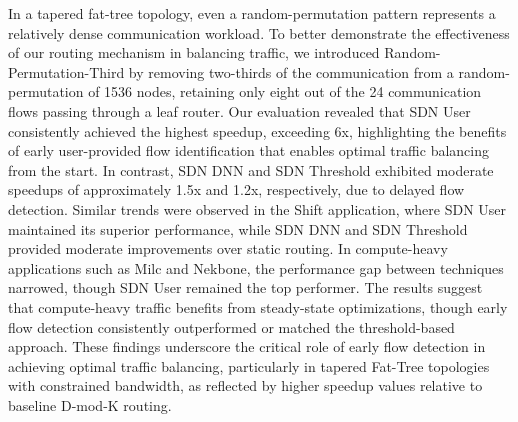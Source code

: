In a tapered fat-tree topology, even a random-permutation pattern represents a relatively dense communication workload. To better demonstrate the effectiveness of our routing mechanism in balancing traffic, we introduced Random-Permutation-Third by removing two-thirds of the communication from a random-permutation of 1536 nodes, retaining only eight out of the 24 communication flows passing through a leaf router. Our evaluation revealed that SDN User consistently achieved the highest speedup, exceeding 6x, highlighting the benefits of early user-provided flow identification that enables optimal traffic balancing from the start. In contrast, SDN DNN and SDN Threshold exhibited moderate speedups of approximately 1.5x and 1.2x, respectively, due to delayed flow detection. Similar trends were observed in the Shift application, where SDN User maintained its superior performance, while SDN DNN and SDN Threshold provided moderate improvements over static routing. In compute-heavy applications such as Milc and Nekbone, the performance gap between techniques narrowed, though SDN User remained the top performer. The results suggest that compute-heavy traffic benefits from steady-state optimizations, though early flow detection consistently outperformed or matched the threshold-based approach. These findings underscore the critical role of early flow detection in achieving optimal traffic balancing, particularly in tapered Fat-Tree topologies with constrained bandwidth, as reflected by higher speedup values relative to baseline D-mod-K routing.

